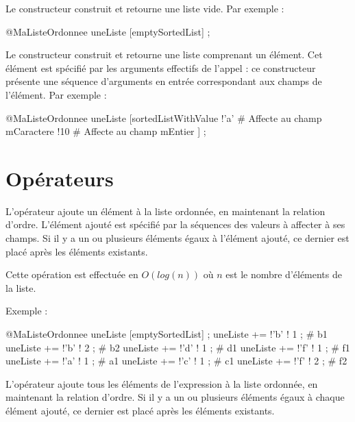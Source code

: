 Le constructeur  construit et retourne une liste vide. Par exemple :
\begin{galgascode}
@MaListeOrdonnee uneListe [emptySortedList] ;
\end{galgascode}



Le constructeur  construit et retourne une liste comprenant un élément. Cet élément est spécifié par les arguments effectifs de l'appel : ce constructeur présente une séquence d'arguments en entrée correspondant aux champs de l'élément. Par exemple :

\begin{galgascode}
@MaListeOrdonnee uneListe [sortedListWithValue
  !'a' # Affecte au champ mCaractere
  !10  # Affecte au champ mEntier
] ;
\end{galgascode}






\section{Opérateurs}



L'opérateur \galgas{+=} ajoute un élément à la liste ordonnée, en maintenant la relation d'ordre. L'élément ajouté est spécifié par la séquences des valeurs à affecter à ses champs. Si il y a un ou plusieurs éléments égaux à l'élément ajouté, ce dernier est placé après les éléments existants. 


Cette opération est effectuée en $O(log (n))$ où $n$ est le nombre d'éléments de la liste.

Exemple :

\begin{galgascode}
@MaListeOrdonnee uneListe [emptySortedList] ;
uneListe += !'b' ! 1 ; # b1
uneListe += !'b' ! 2 ; # b2
uneListe += !'d' ! 1 ; # d1
uneListe += !'f' ! 1 ; # f1
uneListe += !'a' ! 1 ; # a1
uneListe += !'c' ! 1 ; # c1
uneListe += !'f' ! 2 ; # f2
\end{galgascode}


L'opérateur  ajoute tous les éléments de l'expression à la liste ordonnée, en maintenant la relation d'ordre. Si il y a un ou plusieurs éléments égaux à chaque élément ajouté, ce dernier est placé après les éléments existants. 


